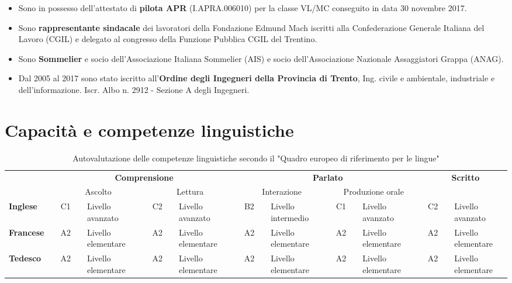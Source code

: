 \documentclass{curriculum}
\begin{document}
\begin{itemize}[label=\textendash]
            \item Sono in possesso dell'attestato di \textbf{pilota APR} (I.APRA.006010) per la classe VL/MC conseguito in data 30 novembre 2017.
            \item Sono \textbf{rappresentante sindacale} dei lavoratori della Fondazione Edmund Mach iscritti alla Confederazione Generale Italiana del Lavoro (CGIL) e delegato al congresso della Funzione Pubblica CGIL del Trentino.
            \item Sono \textbf{Sommelier} e socio dell'Associazione Italiana Sommelier (AIS) e socio dell'Associazione Nazionale Assaggiatori Grappa (ANAG).
            \item Dal 2005 al 2017 sono stato iscritto all'\textbf{Ordine degli Ingegneri della Provincia di Trento}, Ing. civile e ambientale, industriale e dell'informazione. Iscr. Albo n. 2912 - Sezione A degli Ingegneri. 
        \end{itemize}

        \section{Capacità e competenze linguistiche}
        \begin{table}[h]
        \centering
        \fontsize{8}{9}\selectfont
            \begin{tabular}{l c c c l c c c l c c c l c c c l c c c l}
                \toprule
                & & \multicolumn{7}{c}{\textbf{Comprensione}} & & \multicolumn{7}{c}{\textbf{Parlato}} & & \multicolumn{3}{c}{\textbf{Scritto}}\\
                & & \multicolumn{3}{c}{Ascolto} & &\multicolumn{3}{c}{Lettura} & & \multicolumn{3}{c}{Interazione} & &\multicolumn{3}{c}{Produzione orale}  & & \multicolumn{3}{c}{}\\
                \cmidrule{3-9} \cmidrule{11-17} \cmidrule{19-21}
                \textbf{Inglese} & \phantom{ab} & C1 & \phantom{a} & Livello avanzato & \phantom{ab} & C2 & \phantom{a} & Livello avanzato & \phantom{ab} & B2 & \phantom{a} & Livello intermedio & \phantom{ab} & C1 & \phantom{a} & Livello avanzato & \phantom{ab} & C2 & \phantom{a} & Livello avanzato\\
                \textbf{Francese} & \phantom{ab} & A2 & \phantom{a} & Livello elementare & \phantom{ab} & A2 & \phantom{a} & Livello elementare & \phantom{ab} & A2 & \phantom{a} & Livello elementare & \phantom{ab} & A2 & \phantom{a} & Livello elementare & \phantom{ab} & A2 & \phantom{a} & Livello elementare\\
                \textbf{Tedesco}  & \phantom{ab} & A2 & \phantom{a} & Livello elementare & \phantom{ab} & A2 & \phantom{a} & Livello elementare & \phantom{ab} & A2 & \phantom{a} & Livello elementare & \phantom{ab} & A2 & \phantom{a} & Livello elementare & \phantom{ab} & A2 & \phantom{a} & Livello elementare\\
                \bottomrule
            \end{tabular}
            \caption*{\fontsize{9}{10}\selectfont Autovalutazione delle competenze linguistiche secondo il "Quadro europeo di riferimento per le lingue"}
        \end{table}
\end{document}

